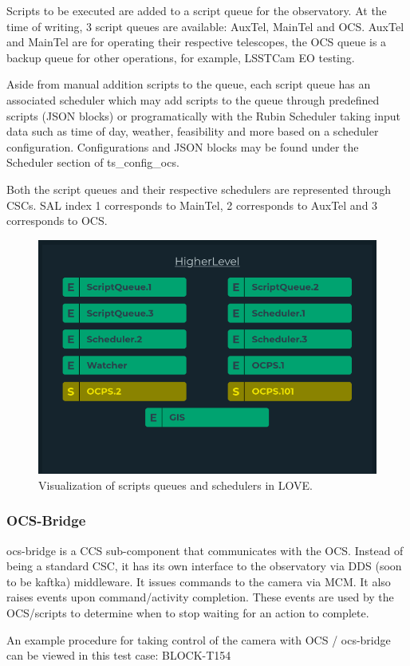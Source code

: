 Scripts to be executed are added to a script queue for the observatory. At the time of writing, 3 script queues are available: AuxTel, MainTel and OCS. AuxTel and MainTel are for operating their respective telescopes, the OCS queue is a backup queue for other operations, for example, LSSTCam EO testing.

Aside from manual addition scripts to the queue, each script queue has an associated scheduler which may add scripts to the queue through predefined scripts (JSON blocks) or programatically with the Rubin Scheduler taking input data such as time of day, weather, feasibility and more based on a scheduler configuration. Configurations and JSON blocks may be found under the Scheduler section of ts\_config\_ocs.

Both the script queues and their respective schedulers are represented through CSCs. SAL index 1 corresponds to MainTel, 2 corresponds to AuxTel and 3 corresponds to OCS.

\begin{figure}
    \centering
    \includegraphics[width=0.6\linewidth]{figures/appendixFigs/schedulerscriptqueue.png}
    \caption{Visualization of scripts queues and schedulers in LOVE.}
    \label{fig:app:schedulerscriptqueue.png}
\end{figure}

\subsubsection{OCS-Bridge}
ocs-bridge is a CCS sub-component that communicates with the OCS. Instead of being a standard CSC, it has its own interface to the observatory via DDS (soon to be kaftka) middleware. It issues commands to the camera via MCM. It also raises events upon command/activity completion. These events are used by the OCS/scripts to determine when to stop waiting for an action to complete.

An example procedure for taking control of the camera with OCS / ocs-bridge can be viewed in this test case: BLOCK-T154

